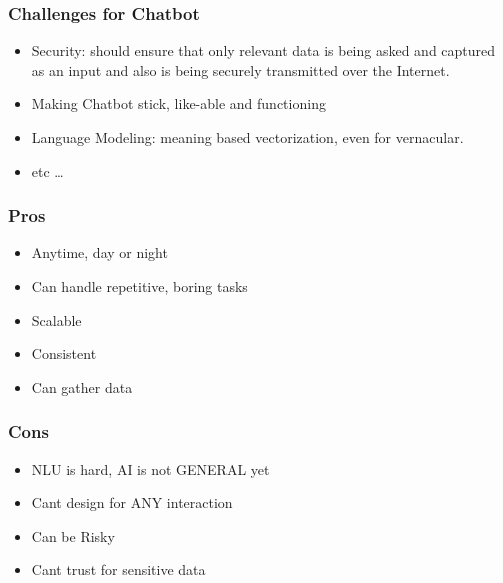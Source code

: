 
  
 

\begin{frame}[fragile]\frametitle{Challenges for Chatbot}

\begin{itemize}
\item Security:  should ensure that only relevant data is being asked and captured as an input and also is being securely transmitted over the Internet.
\item Making Chatbot stick, like-able and functioning
\item Language Modeling: meaning based vectorization, even for vernacular.
\item etc \ldots
\end{itemize}
\end{frame}

\begin{frame}[fragile]\frametitle{Pros}

	\begin{itemize}
	\item  Anytime, day or night	
	\item Can handle repetitive, boring tasks
	\item Scalable
	\item Consistent
	\item Can gather data
	\end{itemize}


\end{frame}

\begin{frame}[fragile]\frametitle{Cons}

	\begin{itemize}
	\item NLU is hard, AI is not GENERAL yet
	\item Cant design for ANY interaction
	\item Can be Risky
	\item Cant trust for sensitive data
	\end{itemize}


\end{frame}
